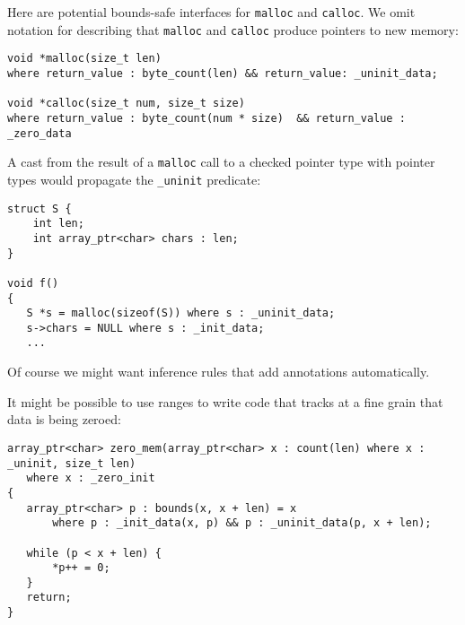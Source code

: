 Here are potential bounds-safe interfaces for \texttt{malloc} and \texttt{calloc}.
We omit notation for describing that \texttt{malloc} and \texttt{calloc} produce 
pointers to new memory:
\begin{verbatim}
void *malloc(size_t len) 
where return_value : byte_count(len) && return_value: _uninit_data;

void *calloc(size_t num, size_t size)
where return_value : byte_count(num * size)  && return_value : _zero_data
\end{verbatim}
A cast from the result of a \texttt{malloc} call to a checked pointer type with pointer types
would propagate the  \texttt{\_uninit} predicate:
\begin{verbatim}
struct S {
    int len;
    int array_ptr<char> chars : len;
}

void f() 
{
   S *s = malloc(sizeof(S)) where s : _uninit_data;
   s->chars = NULL where s : _init_data;
   ...
\end{verbatim}
Of course we might want inference rules that add annotations automatically.  

It might be possible to use ranges to write code that tracks at a fine grain that 
data is being zeroed:
\begin{verbatim}
array_ptr<char> zero_mem(array_ptr<char> x : count(len) where x : _uninit, size_t len) 
   where x : _zero_init
{
   array_ptr<char> p : bounds(x, x + len) = x
       where p : _init_data(x, p) && p : _uninit_data(p, x + len);
       
   while (p < x + len) { 
       *p++ = 0;
   }
   return;
}
\end{verbatim}
